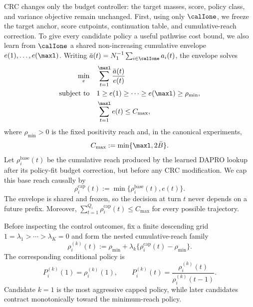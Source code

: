CRC changes only the budget controller: the target masses, score, policy
class, and variance objective remain unchanged.  First, using only
$\calIone$, we freeze the target anchor, score cutpoints, continuation table,
and cumulative-reach correction.  To give every candidate policy a useful
pathwise cost bound, we also learn from $\calIone$ a shared non-increasing
cumulative envelope $e(1),\ldots,e(\maxl)$.  Writing
$\bar a(t)=N_1^{-1}\sum_{i\in\calIone}a_i(t)$, the envelope solves
\begin{equation}
\begin{aligned}
    \min_e\quad&\sum_{t=1}^{\maxl}\frac{\bar a(t)}{e(t)}\\
    \text{subject to}\quad
      &1\geq e(1)\geq\cdots\geq e(\maxl)\geq\rho_{\min},\\
      &\sum_{t=1}^{\maxl}e(t)\leq C_{\max},
\end{aligned}
\label{eq:dapro_lpb_crc_envelope}
\end{equation}
where $\rho_{\min}>0$ is the fixed positivity reach and, in the canonical
experiments,
\begin{equation}
    C_{\max}:=\min\{\maxl,2\bar B\}.
    \label{eq:dapro_lpb_crc_cap}
\end{equation}
Let $\rho_i^{\mathrm{base}}(t)$ be the cumulative reach produced by the
learned DAPRO lookup after its policy-fit budget correction, but before any
CRC modification.  We cap this base reach causally by
\begin{equation}
    \rho_i^{\mathrm{cap}}(t)
    :=\min\{\rho_i^{\mathrm{base}}(t),e(t)\}.
    \label{eq:dapro_lpb_crc_apply_cap}
\end{equation}
The envelope is shared and frozen, so the decision at turn $t$ never depends
on a future prefix.  Moreover,
$\sum_{t=1}^{Q_i}\rho_i^{\mathrm{cap}}(t)\leq C_{\max}$ for every possible
trajectory.

Before inspecting the control outcomes, fix a finite descending grid
$1=\lambda_1>\cdots>\lambda_K=0$ and form the nested cumulative-reach family
\begin{equation}
    \rho_i^{(k)}(t)
    :=\rho_{\min}
      +\lambda_k\{\rho_i^{\mathrm{cap}}(t)-\rho_{\min}\}.
    \label{eq:dapro_lpb_crc_family}
\end{equation}
The corresponding conditional policy is
\begin{equation}
    P_i^{(k)}(1)=\rho_i^{(k)}(1),
    \qquad
    P_i^{(k)}(t)=
      \frac{\rho_i^{(k)}(t)}{\rho_i^{(k)}(t-1)}.
    \label{eq:dapro_lpb_crc_conditionals}
\end{equation}
Candidate $k=1$ is the most aggressive capped policy, while later candidates
contract monotonically toward the minimum-reach policy.

